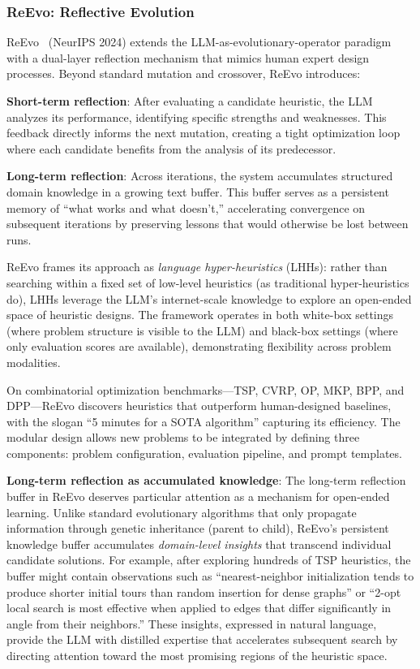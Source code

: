 \subsubsection{ReEvo: Reflective Evolution}

ReEvo~\citep{reevo2024} (NeurIPS 2024) extends the LLM-as-evolutionary-operator paradigm with a dual-layer reflection mechanism that mimics human expert design processes. Beyond standard mutation and crossover, ReEvo introduces:

\textbf{Short-term reflection}: After evaluating a candidate heuristic, the LLM analyzes its performance, identifying specific strengths and weaknesses. This feedback directly informs the next mutation, creating a tight optimization loop where each candidate benefits from the analysis of its predecessor.

\textbf{Long-term reflection}: Across iterations, the system accumulates structured domain knowledge in a growing text buffer. This buffer serves as a persistent memory of ``what works and what doesn't,'' accelerating convergence on subsequent iterations by preserving lessons that would otherwise be lost between runs.

ReEvo frames its approach as \emph{language hyper-heuristics} (LHHs): rather than searching within a fixed set of low-level heuristics (as traditional hyper-heuristics do), LHHs leverage the LLM's internet-scale knowledge to explore an open-ended space of heuristic designs. The framework operates in both white-box settings (where problem structure is visible to the LLM) and black-box settings (where only evaluation scores are available), demonstrating flexibility across problem modalities.

On combinatorial optimization benchmarks---TSP, CVRP, OP, MKP, BPP, and DPP---ReEvo discovers heuristics that outperform human-designed baselines, with the slogan ``5 minutes for a SOTA algorithm'' capturing its efficiency. The modular design allows new problems to be integrated by defining three components: problem configuration, evaluation pipeline, and prompt templates.

\textbf{Long-term reflection as accumulated knowledge}: The long-term reflection buffer in ReEvo deserves particular attention as a mechanism for open-ended learning. Unlike standard evolutionary algorithms that only propagate information through genetic inheritance (parent to child), ReEvo's persistent knowledge buffer accumulates \emph{domain-level insights} that transcend individual candidate solutions. For example, after exploring hundreds of TSP heuristics, the buffer might contain observations such as ``nearest-neighbor initialization tends to produce shorter initial tours than random insertion for dense graphs'' or ``2-opt local search is most effective when applied to edges that differ significantly in angle from their neighbors.'' These insights, expressed in natural language, provide the LLM with distilled expertise that accelerates subsequent search by directing attention toward the most promising regions of the heuristic space.

